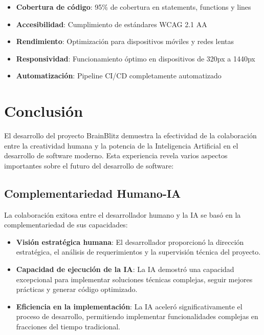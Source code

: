 \documentclass[12pt,a4paper]{article}
\begin{document}
\begin{itemize}
    \item \textbf{Cobertura de código}: 95\% de cobertura en statements, functions y lines
    \item \textbf{Accesibilidad}: Cumplimiento de estándares WCAG 2.1 AA
    \item \textbf{Rendimiento}: Optimización para dispositivos móviles y redes lentas
    \item \textbf{Responsividad}: Funcionamiento óptimo en dispositivos de 320px a 1440px
    \item \textbf{Automatización}: Pipeline CI/CD completamente automatizado
\end{itemize}

\section{Conclusión}

El desarrollo del proyecto BrainBlitz demuestra la efectividad de la colaboración entre la creatividad humana y la potencia de la Inteligencia Artificial en el desarrollo de software moderno. Esta experiencia revela varios aspectos importantes sobre el futuro del desarrollo de software:

\subsection{Complementariedad Humano-IA}

La colaboración exitosa entre el desarrollador humano y la IA se basó en la complementariedad de sus capacidades:

\begin{itemize}
    \item \textbf{Visión estratégica humana}: El desarrollador proporcionó la dirección estratégica, el análisis de requerimientos y la supervisión técnica del proyecto.
    
    \item \textbf{Capacidad de ejecución de la IA}: La IA demostró una capacidad excepcional para implementar soluciones técnicas complejas, seguir mejores prácticas y generar código optimizado.
    
    \item \textbf{Eficiencia en la implementación}: La IA aceleró significativamente el proceso de desarrollo, permitiendo implementar funcionalidades complejas en fracciones del tiempo tradicional.
\end{itemize}
\end{document}
